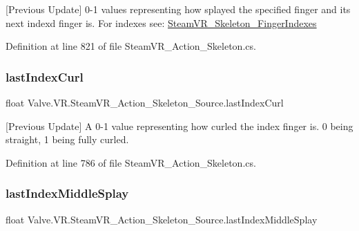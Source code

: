 \mbox{[}Previous Update\mbox{]} 0-\/1 values representing how splayed the specified finger and it\textquotesingle{}s next index\textquotesingle{}d finger is. For indexes see\+: \mbox{\hyperlink{class_valve_1_1_v_r_1_1_steam_v_r___skeleton___finger_indexes}{Steam\+V\+R\+\_\+\+Skeleton\+\_\+\+Finger\+Indexes}} 



Definition at line 821 of file Steam\+V\+R\+\_\+\+Action\+\_\+\+Skeleton.\+cs.

\mbox{\label{class_valve_1_1_v_r_1_1_steam_v_r___action___skeleton___source_abfcf2cc02eb5bccf7b7b88572ffa2b86}} 
\subsubsection{\texorpdfstring{lastIndexCurl}{lastIndexCurl}}
{\footnotesize\ttfamily float Valve.\+V\+R.\+Steam\+V\+R\+\_\+\+Action\+\_\+\+Skeleton\+\_\+\+Source.\+last\+Index\+Curl\hspace{0.3cm}{\ttfamily [get]}}



\mbox{[}Previous Update\mbox{]} A 0-\/1 value representing how curled the index finger is. 0 being straight, 1 being fully curled. 



Definition at line 786 of file Steam\+V\+R\+\_\+\+Action\+\_\+\+Skeleton.\+cs.

\mbox{\label{class_valve_1_1_v_r_1_1_steam_v_r___action___skeleton___source_a8bd182b3e5643a197add997e66f51a91}} 
\subsubsection{\texorpdfstring{lastIndexMiddleSplay}{lastIndexMiddleSplay}}
{\footnotesize\ttfamily float Valve.\+V\+R.\+Steam\+V\+R\+\_\+\+Action\+\_\+\+Skeleton\+\_\+\+Source.\+last\+Index\+Middle\+Splay\hspace{0.3cm}{\ttfamily [get]}}




